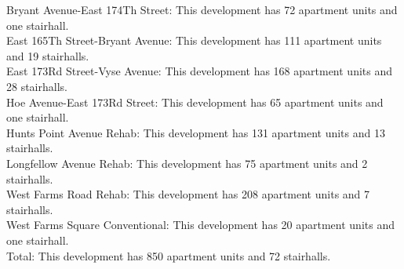 {Bryant Avenue-East 174Th Street}: This development has 72 apartment units and one stairhall.\\{East 165Th Street-Bryant Avenue}: This development has 111 apartment units and 19 stairhalls.\\{East 173Rd Street-Vyse Avenue}: This development has 168 apartment units and 28 stairhalls.\\{Hoe Avenue-East 173Rd Street}: This development has 65 apartment units and one stairhall.\\{Hunts Point Avenue Rehab}: This development has 131 apartment units and 13 stairhalls.\\{Longfellow Avenue Rehab}: This development has 75 apartment units and 2 stairhalls.\\{West Farms Road Rehab}: This development has 208 apartment units and 7 stairhalls.\\{West Farms Square Conventional}: This development has 20 apartment units and one stairhall.\\{Total}: This development has 850 apartment units and 72 stairhalls.\\